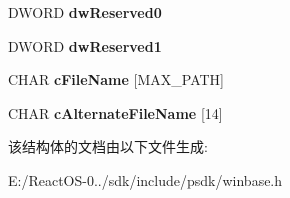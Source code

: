 \begin{DoxyCompactItemize}
D\+W\+O\+RD {\bfseries dw\+Reserved0}
\item 
\mbox{\label{struct___w_i_n32___f_i_n_d___d_a_t_a_a_a230142d415d22026ec0ed65f8b89b4a5}} 
D\+W\+O\+RD {\bfseries dw\+Reserved1}
\item 
\mbox{\label{struct___w_i_n32___f_i_n_d___d_a_t_a_a_aa18bae6307456020e48e3b019a031feb}} 
C\+H\+AR {\bfseries c\+File\+Name} \mbox{[}M\+A\+X\+\_\+\+P\+A\+TH\mbox{]}
\item 
\mbox{\label{struct___w_i_n32___f_i_n_d___d_a_t_a_a_aade1f0786b57ecdf1639c1bab19dec86}} 
C\+H\+AR {\bfseries c\+Alternate\+File\+Name} \mbox{[}14\mbox{]}
\end{DoxyCompactItemize}


该结构体的文档由以下文件生成\+:\begin{DoxyCompactItemize}
\item 
E\+:/\+React\+O\+S-\/0../sdk/include/psdk/winbase.\+h\end{DoxyCompactItemize}
